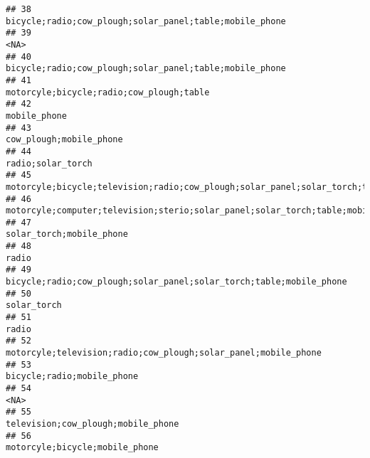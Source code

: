 \documentclass[
]{article}
\begin{document}
\begin{verbatim}
## 38                                                                                   bicycle;radio;cow_plough;solar_panel;table;mobile_phone
## 39                                                                                                                                      <NA>
## 40                                                                                   bicycle;radio;cow_plough;solar_panel;table;mobile_phone
## 41                                                                                                  motorcyle;bicycle;radio;cow_plough;table
## 42                                                                                                                              mobile_phone
## 43                                                                                                                   cow_plough;mobile_phone
## 44                                                                                                                         radio;solar_torch
## 45                                                  motorcyle;bicycle;television;radio;cow_plough;solar_panel;solar_torch;table;mobile_phone
## 46                                                           motorcyle;computer;television;sterio;solar_panel;solar_torch;table;mobile_phone
## 47                                                                                                                  solar_torch;mobile_phone
## 48                                                                                                                                     radio
## 49                                                                       bicycle;radio;cow_plough;solar_panel;solar_torch;table;mobile_phone
## 50                                                                                                                               solar_torch
## 51                                                                                                                                     radio
## 52                                                                            motorcyle;television;radio;cow_plough;solar_panel;mobile_phone
## 53                                                                                                                bicycle;radio;mobile_phone
## 54                                                                                                                                      <NA>
## 55                                                                                                        television;cow_plough;mobile_phone
## 56                                                                                                            motorcyle;bicycle;mobile_phone

\end{verbatim}
\end{document}
